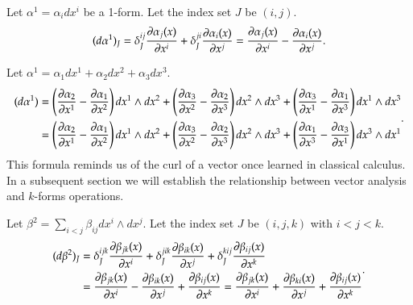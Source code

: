 \documentclass[11pt, a4paper]{book}
\begin{document}
\begin{Example}
  Let $\alpha^1 = \alpha_i dx^i$ be a 1-form. Let the index set $J$ be $(i,j)$.
  \begin{equation}
    \label{eq:exterior-diff-1-form}
    (d\alpha^1)_{J} = \delta_{J}^{ij} \frac{\partial \alpha_j(x)}{\partial x^i} +
    \delta_{J}^{ji} \frac{\partial \alpha_i(x)}{\partial x^j} = \frac{\partial
      \alpha_j(x)}{\partial x^i} - \frac{\partial \alpha_i(x)}{\partial x^j}.
  \end{equation}
\end{Example}

\begin{Example}
  Let $\alpha^1 = \alpha_1dx^1 + \alpha_2dx^2 + \alpha_3dx^3$.
  \begin{equation}
    \label{eq:exterior-diff-1-form-3d}
    \begin{aligned}
      (d\alpha^1) &= \left( \frac{\partial \alpha_2}{\partial x^1} - \frac{\partial
          \alpha_1}{\partial x^2} \right) dx^1 \wedge dx^2 + \left( \frac{\partial
          \alpha_3}{\partial x^2} - \frac{\partial \alpha_2}{\partial x^3} \right) dx^2 \wedge
      dx^3 + \left( \frac{\partial \alpha_3}{\partial x^1} - \frac{\partial \alpha_1}{\partial x^3}
      \right) dx^1 \wedge dx^3 \\
      &= \left( \frac{\partial \alpha_2}{\partial x^1} - \frac{\partial
          \alpha_1}{\partial x^2} \right) dx^1 \wedge dx^2 + \left( \frac{\partial
          \alpha_3}{\partial x^2} - \frac{\partial \alpha_2}{\partial x^3} \right) dx^2 \wedge
      dx^3 + \left( \frac{\partial \alpha_1}{\partial x^3} - \frac{\partial \alpha_3}{\partial x^1}
      \right) dx^3 \wedge dx^1
    \end{aligned}.
  \end{equation}
  This formula reminds us of the curl of a vector once learned in classical calculus. In a
  subsequent section we will establish the relationship between vector analysis and
  $k$-forms operations.
\end{Example}

\begin{Example}
  Let $\beta^2 = \sum_{i < j} \beta_{ij} dx^i \wedge dx^j$. Let the index set $J$ be
  $(i,j,k)$ with $i < j < k$.
  \begin{equation}
    \label{eq:exterior-diff-2-form}
    \begin{aligned}
      (d\beta^2)_{J} &= \delta_J^{ijk} \frac{\partial \beta_{jk}(x)}{\partial x^i} +
      \delta_J^{jik} \frac{\partial \beta_{ik}(x)}{\partial x^j} + \delta_J^{kij} \frac{\partial
        \beta_{ij}(x)}{\partial x^k} \\
      &= \frac{\partial \beta_{jk}(x)}{\partial x^i} - \frac{\partial \beta_{ik}(x)}{\partial x^j}
      + \frac{\partial \beta_{ij}(x)}{\partial x^k} = \frac{\partial \beta_{jk}(x)}{\partial x^i}
      + \frac{\partial \beta_{ki}(x)}{\partial x^j} + \frac{\partial \beta_{ij}(x)}{\partial x^k}
    \end{aligned}.
  \end{equation}
\end{Example}
\end{document}
